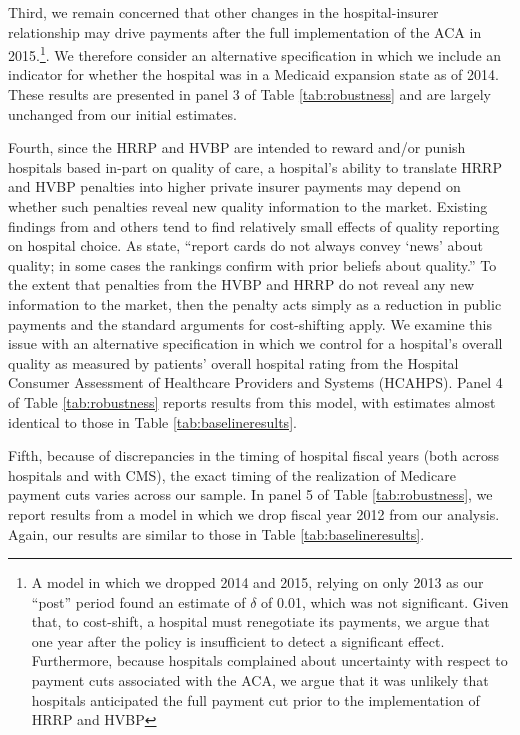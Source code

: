 \documentclass[12pt]{article}
\begin{document}
Third, we remain concerned that other changes in the hospital-insurer relationship may drive payments after the full implementation of the ACA in 2015.\footnote{A model in which we dropped 2014 and 2015, relying on only 2013 as our ``post'' period found an estimate of $\delta$ of 0.01, which was not significant.  Given that, to cost-shift, a hospital must renegotiate its payments, we argue that one year after the policy is insufficient to detect a significant effect.  Furthermore, because hospitals complained about uncertainty with respect to payment cuts associated with the ACA, we argue that it was unlikely that hospitals anticipated the full payment cut prior to the implementation of HRRP and HVBP}. We therefore consider an alternative specification in which we include an indicator for whether the hospital was in a Medicaid expansion state as of 2014. These results are presented in panel 3 of Table \ref{tab:robustness} and are largely unchanged from our initial estimates.

Fourth, since the HRRP and HVBP are intended to reward and/or punish hospitals based in-part on quality of care, a hospital's ability to translate HRRP and HVBP penalties into higher private insurer payments may depend on whether such penalties reveal new quality information to the market. Existing findings from \cite{dranove2008} and others tend to find relatively small effects of quality reporting on hospital choice. As \cite{dranove2008} state, ``report cards do not always convey `news' about quality; in some cases the rankings confirm with prior beliefs about quality.'' To the extent that penalties from the HVBP and HRRP do not reveal any new information to the market, then the penalty acts simply as a reduction in public payments and the standard arguments for cost-shifting apply. We examine this issue with an alternative specification in which we control for a hospital's overall quality as measured by patients' overall hospital rating from the Hospital Consumer Assessment of Healthcare Providers and Systems (HCAHPS).  Panel 4 of Table \ref{tab:robustness} reports results from this model, with estimates almost identical to those in Table \ref{tab:baselineresults}.

Fifth, because of discrepancies in the timing of hospital fiscal years (both across hospitals and with CMS), the exact timing of the realization of Medicare payment cuts varies across our sample. In panel 5 of Table \ref{tab:robustness}, we report results from a model in which we drop fiscal year 2012 from our analysis. Again, our results are similar to those in Table \ref{tab:baselineresults}.
\end{document}
